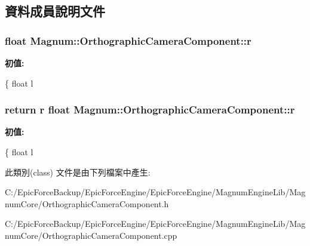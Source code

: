 \subsection{資料成員說明文件}
\subsubsection[{\texorpdfstring{r}{r}}]{\setlength{\rightskip}{0pt plus 5cm}float Magnum\+::\+Orthographic\+Camera\+Component\+::r}\hypertarget{class_magnum_1_1_orthographic_camera_component_ab79dd8984c392958fe15fa15704beb9b}{}\label{class_magnum_1_1_orthographic_camera_component_ab79dd8984c392958fe15fa15704beb9b}
{\bfseries 初值\+:}
\begin{DoxyCode}
\{
            \textcolor{keywordtype}{float} l
\end{DoxyCode}
\subsubsection[{\texorpdfstring{r}{r}}]{\setlength{\rightskip}{0pt plus 5cm}return r float Magnum\+::\+Orthographic\+Camera\+Component\+::r}\hypertarget{class_magnum_1_1_orthographic_camera_component_a883b6e464a86fde39a70bb8e29c9c649}{}\label{class_magnum_1_1_orthographic_camera_component_a883b6e464a86fde39a70bb8e29c9c649}
{\bfseries 初值\+:}
\begin{DoxyCode}
\{
            \textcolor{keywordtype}{float} l
\end{DoxyCode}


此類別(class) 文件是由下列檔案中產生\+:\begin{DoxyCompactItemize}
\item 
C\+:/\+Epic\+Force\+Backup/\+Epic\+Force\+Engine/\+Epic\+Force\+Engine/\+Magnum\+Engine\+Lib/\+Magnum\+Core/Orthographic\+Camera\+Component.\+h\item 
C\+:/\+Epic\+Force\+Backup/\+Epic\+Force\+Engine/\+Epic\+Force\+Engine/\+Magnum\+Engine\+Lib/\+Magnum\+Core/Orthographic\+Camera\+Component.\+cpp\end{DoxyCompactItemize}
